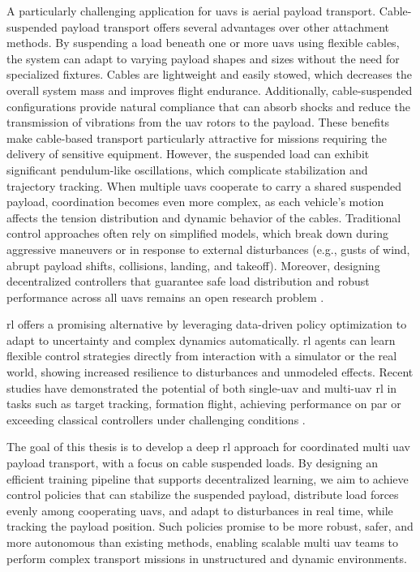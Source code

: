 A particularly challenging application for \glspl{uav} is aerial payload transport. Cable-suspended payload transport offers several advantages over other attachment methods. By suspending a load beneath one or more \glspl{uav} using flexible cables, the system can adapt to varying payload shapes and sizes without the need for specialized fixtures. Cables are lightweight and easily stowed, which decreases the overall system mass and improves flight endurance. Additionally, cable-suspended configurations provide natural compliance that can absorb shocks and reduce the transmission of vibrations from the \gls{uav} rotors to the payload. These benefits make cable-based transport particularly attractive for missions requiring the delivery of sensitive equipment. However, the suspended load can exhibit significant pendulum-like oscillations, which complicate stabilization and trajectory tracking. When multiple \glspl{uav} cooperate to carry a shared suspended payload, coordination becomes even more complex, as each vehicle's motion affects the tension distribution and dynamic behavior of the cables. Traditional control approaches often rely on simplified models, which break down during aggressive maneuvers or in response to external disturbances (e.g., gusts of wind, abrupt payload shifts, collisions, landing, and takeoff). Moreover, designing decentralized controllers that guarantee safe load distribution and robust performance across all \glspl{uav} remains an open research problem \cite{estevez_review_2024}.

\gls{rl} offers a promising alternative by leveraging data-driven policy optimization to adapt to uncertainty and complex dynamics automatically. \gls{rl} agents can learn flexible control strategies directly from interaction with a simulator or the real world, showing increased resilience to disturbances and unmodeled effects. Recent studies have demonstrated the potential of both single-\gls{uav} and multi-\gls{uav} \gls{rl} in tasks such as target tracking, formation flight, achieving performance on par or exceeding classical controllers under challenging conditions \autocite{Hwangbo2017ControlOA, kaufmann_champion-level_2023, Song2023ReachingTL, huang_collision_2024,Eschmann2024}.

The goal of this thesis is to develop a deep \gls{rl} approach for coordinated multi \gls{uav} payload transport, with a focus on cable suspended loads. By designing an efficient training pipeline that supports decentralized learning, we aim to achieve control policies that can stabilize the suspended payload, distribute load forces evenly among cooperating \glspl{uav}, and adapt to disturbances in real time, while tracking the payload position. Such policies promise to be more robust, safer, and more autonomous than existing methods, enabling scalable multi \gls{uav} teams to perform complex transport missions in unstructured and dynamic environments.


